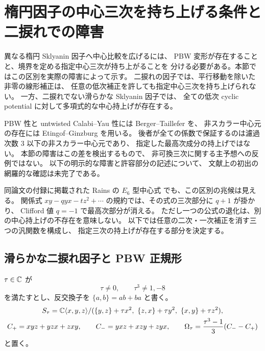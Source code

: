 \section{楕円因子の中心三次を持ち上げる条件と二捩れでの障害}
\label{eco:sec:center-lifting}

異なる楕円 Sklyanin 因子へ中心比較を広げるには、
PBW 変形が存在することと、境界を定める指定中心三次が持ち上がることを
分ける必要がある。本節ではこの区別を実際の障害によって示す。
二捩れの因子では、平行移動を除いた非零の線形補正は、
任意の低次補正を許しても指定中心三次を持ち上げられない。
一方、二捩れでない滑らかな Sklyanin 因子では、
全ての低次 cyclic potential に対して多項式的な中心持上げが存在する。

PBW 性と untwisted Calabi--Yau 性には
Berger--Taillefer \cite[Theorems~3.1, 3.6]{NFMBeTa}を、
非スカラー中心元の存在には Etingof--Ginzburg
\cite[Theorem~3.3.2(ii)]{NFMEG}を用いる。
後者が全ての係数で保証するのは濾過次数 $3$ 以下の非スカラー中心元であり、
指定した最高次成分の持上げではない。
本節の障害はこの差を検出するもので、
非可換三次に関する主予想への反例ではない。
以下の明示的な障害と許容部分の記述について、
文献上の初出の網羅的な確認は未完了である。

同論文の付録に掲載された Rains の $E_6$ 型中心式
\cite[Section~9, p.~1414]{NFMEG}でも、この区別の兆候は見える。
関係式 $xy-qyx-tz^2+\cdots$ の規約では、その式の三次部分に $q+1$ が掛かり、
Clifford 値 $q=-1$ で最高次部分が消える。
ただし一つの公式の退化は、別の中心持上げの不存在を意味しない。
以下では任意の二次・一次補正を消す三つの汎関数を構成し、
指定三次の持上げが存在する部分を決定する。

\subsection{滑らかな二捩れ因子と PBW 正規形}

$\tau\in\mathbb C$ が
\begin{equation}\label{eco:eq:clifford-open}
 \tau\ne0,\qquad \tau^3\ne1,-8
\end{equation}
を満たすとし、反交換子を $\{a,b\}=ab+ba$ と書く。
\begin{gather*}
 S_\tau=\mathbb C\langle x,y,z\rangle/
   (\{y,z\}+\tau x^2,\ \{z,x\}+\tau y^2,\ \{x,y\}+\tau z^2),\\
 C_+=xyz+yzx+zxy,\qquad C_-=yxz+xzy+zyx,\qquad
 \Omega_\tau=\frac{\tau^3-1}{3}(C_--C_+)
\end{gather*}
と置く。

